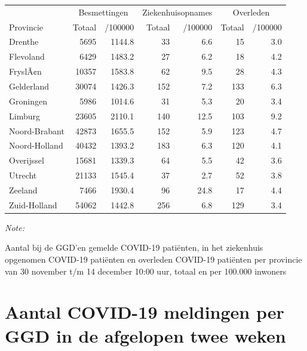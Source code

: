 \documentclass[
  english,
  man,floatsintext]{apa6}
\begin{document}
\begin{table}
\centering
\begin{threeparttable}
\begin{tabular}{lrrrrrr}
\toprule
\multicolumn{1}{c}{ } & \multicolumn{2}{c}{Besmettingen} & \multicolumn{2}{c}{Ziekenhuisopnames} & \multicolumn{2}{c}{Overleden} \\
\cmidrule(l{3pt}r{3pt}){2-3} \cmidrule(l{3pt}r{3pt}){4-5} \cmidrule(l{3pt}r{3pt}){6-7}
Provincie & Totaal & /100000 & Totaal & /100000 & Totaal & /100000\\
\midrule
Drenthe & 5695 & 1144.8 & 33 & 6.6 & 15 & 3.0\\
Flevoland & 6429 & 1483.2 & 27 & 6.2 & 18 & 4.2\\
FryslÃ¢n & 10357 & 1583.8 & 62 & 9.5 & 28 & 4.3\\
Gelderland & 30074 & 1426.3 & 152 & 7.2 & 133 & 6.3\\
Groningen & 5986 & 1014.6 & 31 & 5.3 & 20 & 3.4\\
Limburg & 23605 & 2110.1 & 140 & 12.5 & 103 & 9.2\\
Noord-Brabant & 42873 & 1655.5 & 152 & 5.9 & 123 & 4.7\\
Noord-Holland & 40432 & 1393.2 & 183 & 6.3 & 120 & 4.1\\
Overijssel & 15681 & 1339.3 & 64 & 5.5 & 42 & 3.6\\
Utrecht & 21133 & 1545.4 & 37 & 2.7 & 52 & 3.8\\
Zeeland & 7466 & 1930.4 & 96 & 24.8 & 17 & 4.4\\
Zuid-Holland & 54062 & 1442.8 & 256 & 6.8 & 129 & 3.4\\
\bottomrule
\end{tabular}
\begin{tablenotes}
\item \textit{Note: } 
\item Aantal bij de GGD’en gemelde COVID-19 patiënten, in het ziekenhuis opgenomen COVID-19 patiënten en overleden COVID-19 patiënten per provincie van 30 november t/m 14 december 10:00 uur, totaal en per 100.000 inwoners
\end{tablenotes}
\end{threeparttable}
\end{table}

\newpage

\hypertarget{aantal-covid-19-meldingen-per-ggd-in-de-afgelopen-twee-weken}{%
\section{Aantal COVID-19 meldingen per GGD in de afgelopen twee weken}\label{aantal-covid-19-meldingen-per-ggd-in-de-afgelopen-twee-weken}}
\end{document}
